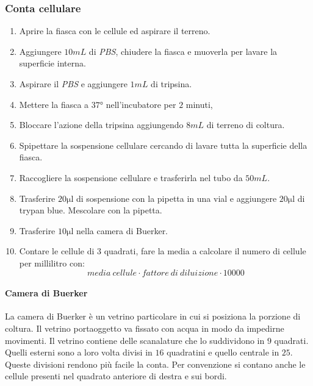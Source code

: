 		\subsubsection{Conta cellulare}
		\begin{multicols}{2}
		\begin{enumerate}
			\item Aprire la fiasca con le cellule ed aspirare il terreno.
			\item Aggiungere $10\si{mL}$ di \emph{PBS}, chiudere la fiasca e muoverla per lavare la superficie interna.
			\item Aspirare il \emph{PBS} e aggiungere $1\si{mL}$ di tripsina.
			\item Mettere la fiasca a $37\si{\degree}$ nell'incubatore per $2$ minuti,
			\item Bloccare l'azione della tripsina aggiungendo $8\si{mL}$ di terreno di coltura.
			\item Spipettare la sospensione cellulare cercando di lavare tutta la superficie della fiasca.
			\item Raccogliere la sospensione cellulare e trasferirla nel tubo da $50\si{mL}$.
			\item Trasferire $20\si{\micro\litre}$ di sospensione con la pipetta in una vial e aggiungere $20\si{\micro\litre}$ di trypan blue. 
				Mescolare con la pipetta.
			\item Trasferire $10\si{\micro\litre}$ nella camera di Buerker.
			\item Contare le cellule di $3$ quadrati, fare la media a calcolare il numero di cellule per millilitro con:
				\[media\ cellule \cdot fattore\ di\ diluizione \cdot \num{10000}\]
		\end{enumerate}
			\end{multicols}
			
			\paragraph{Camera di Buerker}
			La camera di Buerker \`e un vetrino particolare in cui si posiziona la porzione di coltura. 
			Il vetrino portaoggetto va fissato con acqua in modo da impedirne movimenti.
			Il vetrino contiene delle scanalature che lo suddividono in $9$ quadrati.
			Quelli esterni sono a loro volta divisi in $16$ quadratini e quello centrale in $25$.
			Queste divisioni rendono pi\`u facile la conta.
			Per convenzione si contano anche le cellule presenti nel quadrato anteriore di destra e sui bordi.

